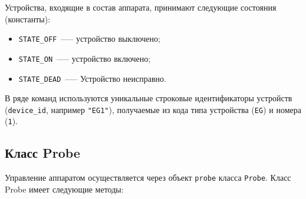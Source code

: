 \documentclass[12pt,a4paper]{article}
\begin{document}
Устройства, входящие в состав аппарата, принимают следующие состояния (константы):

\begin{itemize}
\item \verb'STATE_OFF'~--— устройство выключено;
\item \verb'STATE_ON'~--— устройство включено;
\item \verb'STATE_DEAD'~--— Устройство неисправно.
\end{itemize}

В ряде команд используются уникальные строковые идентификаторы устройств
(\verb'device_id', например \verb'"EG1"'), получаемые из кода типа устройства (\verb'EG')
и номера (\verb'1').

\subsection*{Класс Probe}

Управление аппаратом осуществляется через объект \verb'probe' класса \verb'Probe'. Класс Probe имеет
следующие методы:
\end{document}
